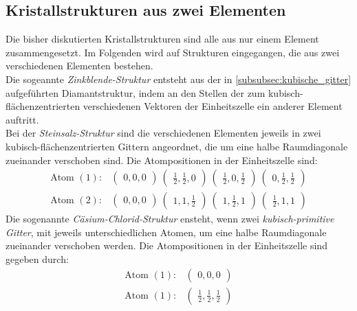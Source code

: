 \subsection{Kristallstrukturen aus zwei Elementen}
\label{subsec:2atome}
Die bisher diskutierten Kristallstrukturen sind alle aus nur
einem Element zusammengesetzt. Im Folgenden wird auf Strukturen
eingegangen, die aus zwei verschiedenen Elementen bestehen.\\
Die sogeannte \textit{Zinkblende-Struktur} entsteht aus der
in \ref{subsubsec:kubische_gitter}
aufgeführten Diamantstruktur, indem an den Stellen der zum
kubisch-flächenzentrierten verschiedenen Vektoren der Einheitszelle
ein anderer Element auftritt.\\
Bei der \textit{Steinsalz-Struktur}
sind die verschiedenen Elementen
jeweils in zwei kubisch-flächenzentrierten Gittern angeordnet, die um eine
halbe Raumdiagonale zueinander verschoben sind. Die Atompositionen
in der Einheitszelle sind:
\begin{align}
\label{eqn:5*}
\text{Atom }(1) :&
\begin{pmatrix}
0, 0, 0
\end{pmatrix}\
\begin{pmatrix}
\frac{1}{2}, \frac{1}{2}, 0
\end{pmatrix}\
\begin{pmatrix}
\frac{1}{2}, 0, \frac{1}{2}
\end{pmatrix}\
\begin{pmatrix}
0, \frac{1}{2}, \frac{1}{2}
\end{pmatrix}\\
\label{eqn:6*}
\text{Atom }(2) :&
\begin{pmatrix}
0, 0, 0
\end{pmatrix}\
\begin{pmatrix}
1, 1, \frac{1}{2}
\end{pmatrix}\
\begin{pmatrix}
1, \frac{1}{2}, 1
\end{pmatrix}\
\begin{pmatrix}
\frac{1}{2}, 1, 1
\end{pmatrix}
\end{align}
Die sogenannte \textit{Cäsium-Chlorid-Struktur}
ensteht, wenn zwei \textit{kubisch-primitive Gitter}, mit jeweils
unterschiedlichen Atomen, um eine halbe Raumdiagonale zueinander
verschoben werden. Die Atompositionen in der Einheitszelle
sind gegeben durch:
\begin{align}
\label{eqn:7*}
\text{Atom }(1) :&
\begin{pmatrix}
0, 0, 0
\end{pmatrix}\\
\label{eqn:8*}
\text{Atom }(1) :&
\begin{pmatrix}
\frac{1}{2}, \frac{1}{2}, \frac{1}{2}
\end{pmatrix}
\end{align}
